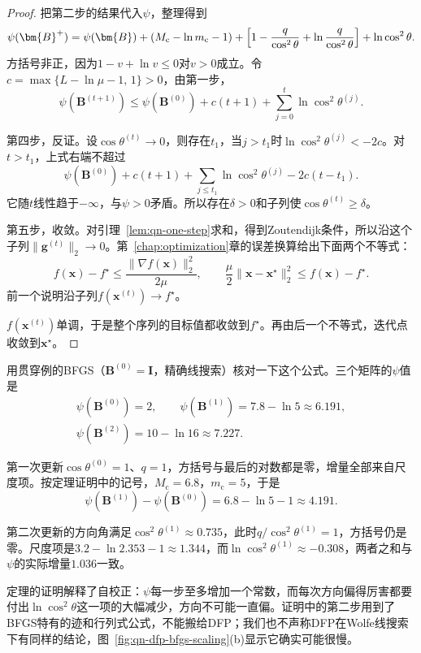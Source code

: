 \begin{proof}
把第二步的结果代入$\psi$，整理得到
\[
 \psi(\bm{B}^{+})=\psi(\bm{B})+(M_{\mathrm{c}}-\ln m_{\mathrm{c}}-1)
 +\Bigl[1-\frac{q}{\cos^2\theta}+\ln\frac{q}{\cos^2\theta}\Bigr]+\ln\cos^2\theta.
\]
方括号非正，因为$1-v+\ln v\leq0$对$v>0$成立。令$c=\max\{L-\ln\mu-1,\,1\}>0$，由第一步，
\[
 \psi(\bm{B}^{(t+1)})\leq\psi(\bm{B}^{(0)})+c(t+1)+\sum_{j=0}^{t}\ln\cos^2\theta^{(j)}.
\]

第四步，反证。设$\cos\theta^{(t)}\to0$，则存在$t_1$，当$j>t_1$时$\ln\cos^2\theta^{(j)}<-2c$。对$t>t_1$，上式右端不超过
\[
 \psi(\bm{B}^{(0)})+c(t+1)+\sum_{j\leq t_1}\ln\cos^2\theta^{(j)}-2c(t-t_1).
\]
它随$t$线性趋于$-\infty$，与$\psi>0$矛盾。所以存在$\delta>0$和子列使$\cos\theta^{(t)}\geq\delta$。

第五步，收敛。对引理~\ref{lem:qn-one-step}求和，得到Zoutendijk条件，所以沿这个子列$\lVert\bm{g}^{(t)}\rVert_2\to0$。第~\ref{chap:optimization}章的误差换算给出下面两个不等式：
\[
 f(\bm{x})-f^\star\leq\frac{\lVert\nabla f(\bm{x})\rVert_2^2}{2\mu},\qquad
 \frac{\mu}{2}\lVert\bm{x}-\bm{x}^\star\rVert_2^2\leq f(\bm{x})-f^\star.
\]
前一个说明沿子列$f(\bm{x}^{(t)})\to f^\star$。

$f(\bm{x}^{(t)})$单调，于是整个序列的目标值都收敛到$f^\star$。再由后一个不等式，迭代点收敛到$\bm{x}^\star$。
\end{proof}

用贯穿例的BFGS（$\bm{B}^{(0)}=\bm{I}$，精确线搜索）核对一下这个公式。三个矩阵的$\psi$值是
\[
 \begin{gathered}
 \psi(\bm{B}^{(0)})=2,\qquad\psi(\bm{B}^{(1)})=7.8-\ln5\approx6.191,\\
 \psi(\bm{B}^{(2)})=10-\ln16\approx7.227.
 \end{gathered}
\]

第一次更新$\cos\theta^{(0)}=1$、$q=1$，方括号与最后的对数都是零，增量全部来自尺度项。按定理证明中的记号，$M_{\mathrm{c}}=6.8$，$m_{\mathrm{c}}=5$，于是
\[
 \psi(\bm{B}^{(1)})-\psi(\bm{B}^{(0)})=6.8-\ln5-1\approx4.191.
\]

第二次更新的方向角满足$\cos^2\theta^{(1)}\approx0.735$，此时$q/\cos^2\theta^{(1)}=1$，方括号仍是零。尺度项是$3.2-\ln2.353-1\approx1.344$，而$\ln\cos^2\theta^{(1)}\approx-0.308$，两者之和与$\psi$的实际增量$1.036$一致。

定理的证明解释了自校正：$\psi$每一步至多增加一个常数，而每次方向偏得厉害都要付出$\ln\cos^2\theta$这一项的大幅减少，方向不可能一直偏。证明中的第二步用到了BFGS特有的迹和行列式公式，不能搬给DFP；我们也不声称DFP在Wolfe线搜索下有同样的结论，图~\ref{fig:qn-dfp-bfgs-scaling}(b)显示它确实可能很慢。

